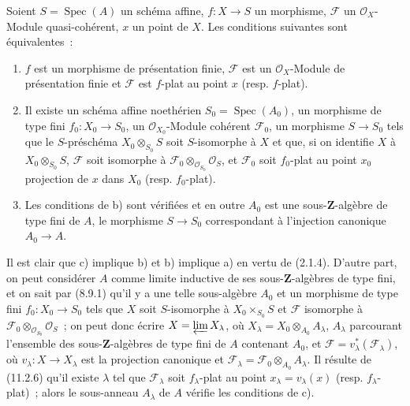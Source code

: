\begin{corollary}[11.2.7]
\label{IV.11.2.7-fr}
Soient $S=\operatorname{Spec}(A)$ un schéma affine, $f:X\to S$ un morphisme,
$\mathcal F$ un $\mathcal O_X$-Module quasi-cohérent, $x$ un point de $X$.
Les conditions suivantes sont équivalentes~:
\begin{enumerate}[label=\emph{\alph*)}]
\item $f$ est un morphisme de présentation finie, $\mathcal F$ est un
$\mathcal O_X$-Module de présentation finie et $\mathcal F$ est $f$-plat au
point $x$ (resp. $f$-plat).


\item Il existe un schéma affine noethérien $S_0=\operatorname{Spec}(A_0)$,
un morphisme de type fini $f_0:X_0\to S_0$, un
$\mathcal O_{X_0}$-Module cohérent $\mathcal F_0$, un morphisme $S\to S_0$
tels que le $S$-préschéma $X_0\otimes_{S_0}S$ soit $S$-isomorphe à $X$ et
que, si on identifie $X$ à $X_0\otimes_{S_0}S$, $\mathcal F$ soit isomorphe
à $\mathcal F_0\otimes_{\mathcal O_{S_0}}\mathcal O_S$, et $\mathcal F_0$
soit $f_0$-plat au point $x_0$ projection de $x$ dans $X_0$ (resp.
$f_0$-plat).
\item Les conditions de b) sont vérifiées et en outre $A_0$ est une
sous-$\mathbf Z$-algèbre de type fini de $A$, le morphisme $S\to S_0$
correspondant à l'injection canonique $A_0\to A$.
\end{enumerate}
\end{corollary}

Il est clair que c) implique b) et b) implique a) en vertu de (2.1.4).
D'autre part, on peut considérer $A$ comme limite inductive de ses
sous-$\mathbf Z$-algèbres de type fini, et on sait par (8.9.1) qu'il y a une
telle sous-algèbre $A_0$ et un morphisme de type fini $f_0:X_0\to S_0$ tels
que $X$ soit $S$-isomorphe à $X_0\times_{S_0}S$ et $\mathcal F$ isomorphe à
$\mathcal F_0\otimes_{\mathcal O_{S_0}}\mathcal O_S$~; on peut donc écrire
$X=\varprojlim X_\lambda$, où $X_\lambda=X_0\otimes_{A_0}A_\lambda$,
$A_\lambda$ parcourant l'ensemble des sous-$\mathbf Z$-algèbres de type
fini de $A$ contenant $A_0$, et $\mathcal F=v_\lambda^*(\mathcal F_\lambda)$,
où $v_\lambda:X\to X_\lambda$ est la projection canonique et
$\mathcal F_\lambda=\mathcal F_0\otimes_{A_0}A_\lambda$. Il résulte de
(11.2.6) qu'il existe $\lambda$ tel que $\mathcal F_\lambda$ soit
$f_\lambda$-plat au point $x_\lambda=v_\lambda(x)$ (resp.
$f_\lambda$-plat)~; alors le sous-anneau $A_\lambda$ de $A$ vérifie les
conditions de c).

